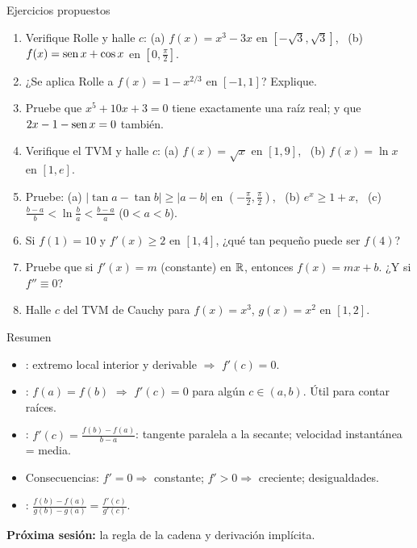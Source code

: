 \documentclass[10pt,aspectratio=169]{beamer}
\begin{document}
\begin{frame}{Ejercicios propuestos}
  \small
  \begin{ejercicio}
    \begin{enumerate}
      \item Verifique Rolle y halle $c$: (a) $f(x)=x^3-3x$ en $[-\sqrt3,\sqrt3]$, \ (b) $f(x)=\operatorname{sen} x+\cos x$ en $\left[0,\frac\pi2\right]$.
      \item ¿Se aplica Rolle a $f(x)=1-x^{2/3}$ en $[-1,1]$? Explique.
      \item Pruebe que $x^5+10x+3=0$ tiene exactamente una raíz real; y que $2x-1-\operatorname{sen} x=0$ también.
      \item Verifique el TVM y halle $c$: (a) $f(x)=\sqrt x$ en $[1,9]$, \ (b) $f(x)=\ln x$ en $[1,e]$.
      \item Pruebe: (a) $|\tan a-\tan b|\ge|a-b|$ en $\left(-\frac\pi2,\frac\pi2\right)$, \ (b) $e^x\ge1+x$, \ (c) $\frac{b-a}{b}<\ln\frac ba<\frac{b-a}{a}$ ($0<a<b$).
      \item Si $f(1)=10$ y $f'(x)\ge2$ en $[1,4]$, ¿qué tan pequeño puede ser $f(4)$?
      \item Pruebe que si $f'(x)=m$ (constante) en $\mathbb{R}$, entonces $f(x)=mx+b$. ¿Y si $f''\equiv0$?
      \item Halle $c$ del TVM de Cauchy para $f(x)=x^3$, $g(x)=x^2$ en $[1,2]$.
    \end{enumerate}
  \end{ejercicio}
\end{frame}

\begin{frame}{Resumen}
  \begin{itemize}
    \item {}: extremo local interior y derivable $\Rightarrow$ $f'(c)=0$.
    \item {}: $f(a)=f(b)$ $\Rightarrow$ $f'(c)=0$ para algún $c\in(a,b)$. Útil para contar raíces.
    \item {}: $f'(c)=\frac{f(b)-f(a)}{b-a}$: tangente paralela a la secante; velocidad instantánea = media.
    \item Consecuencias: $f'=0\Rightarrow$ constante; $f'>0\Rightarrow$ creciente; desigualdades.
    \item {}: $\frac{f(b)-f(a)}{g(b)-g(a)}=\frac{f'(c)}{g'(c)}$.
  \end{itemize}
  \vspace{3mm}
  \textbf{Próxima sesión:} la regla de la cadena y derivación implícita.
\end{frame}
\end{document}
